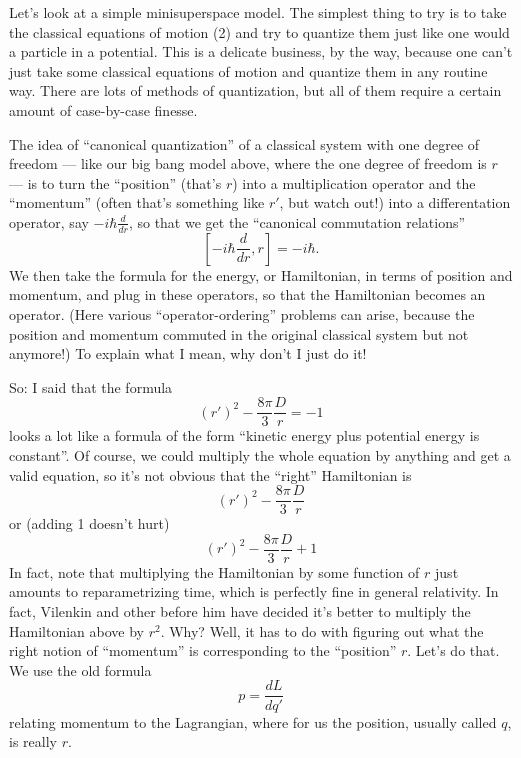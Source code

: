 \documentclass{article}
\begin{document}
Let's look at a simple minisuperspace model. The simplest thing to try
is to take the classical equations of motion (2) and try to quantize
them just like one would a particle in a potential. This is a delicate
business, by the way, because one can't just take some classical
equations of motion and quantize them in any routine way. There are lots
of methods of quantization, but all of them require a certain amount of
case-by-case finesse.

The idea of ``canonical quantization'' of a classical system with one
degree of freedom --- like our big bang model above, where the one
degree of freedom is \(r\) --- is to turn the ``position'' (that's
\(r\)) into a multiplication operator and the ``momentum'' (often that's
something like \(r'\), but watch out!) into a differentation operator,
say \(-i \hbar \frac{d}{dr}\), so that we get the ``canonical
commutation relations'' \[[-i \hbar \frac{d}{dr}, r] = -i \hbar.\] We
then take the formula for the energy, or Hamiltonian, in terms of
position and momentum, and plug in these operators, so that the
Hamiltonian becomes an operator. (Here various ``operator-ordering''
problems can arise, because the position and momentum commuted in the
original classical system but not anymore!) To explain what I mean, why
don't I just do it!

So: I said that the formula
\[(r')^2-\frac{8\pi}{3} \frac{D}{r} = -1 \tag{3}\] looks a lot like a
formula of the form ``kinetic energy plus potential energy is
constant''. Of course, we could multiply the whole equation by anything
and get a valid equation, so it's not obvious that the ``right''
Hamiltonian is \[(r')^2-\frac{8\pi}{3} \frac{D}{r}\] or (adding 1
doesn't hurt) \[(r')^2-\frac{8\pi}{3} \frac{D}{r} + 1\] In fact, note
that multiplying the Hamiltonian by some function of \(r\) just amounts
to reparametrizing time, which is perfectly fine in general relativity.
In fact, Vilenkin and other before him have decided it's better to
multiply the Hamiltonian above by \(r^2\). Why? Well, it has to do with
figuring out what the right notion of ``momentum'' is corresponding to
the ``position'' \(r\). Let's do that. We use the old formula
\[p = \frac{dL}{dq'}\] relating momentum to the Lagrangian, where for us
the position, usually called \(q\), is really \(r\).
\end{document}

